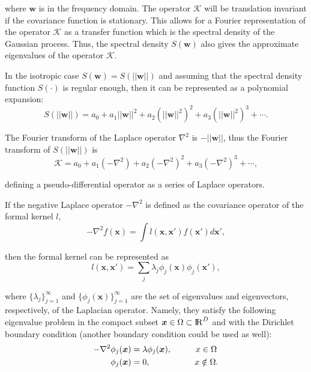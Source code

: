 \documentclass[onecolumn,a4paper,11pt]{article}
\begin{document}
\noindent where $\bm{w}$ is in the frequency domain. The operator $\mathcal{K}$ will be translation invariant if the covariance function is stationary. This allows for a Fourier representation of the operator $\mathcal{K}$ as a transfer function which is the spectral density of the Gaussian process. 
%
Thus, the spectral density $S(\bm{w})$ also gives the approximate eigenvalues of the operator $\mathcal{K}$.

In the isotropic case $S(\bm{w}) = S(||\bm{w}||)$ and assuming that the spectral density function $S(\cdot)$ is regular enough, then it can be represented as a polynomial expansion:
%
\begin{equation}\label{ch5_eq_S}
S(||\bm{w}||)=a_0+a_1||\bm{w}||^2+a_2(||\bm{w}||^2)^2+a_3(||\bm{w}||^2)^3+\cdots.
\end{equation}

\noindent The Fourier transform of the Laplace operator $\nabla^2$ is $-||\bm{w}||$, thus the Fourier transform of $S(||\bm{w}||)$ is
%
\begin{equation}\label{ch5_eq_K}
\mathcal{K}=a_0+a_1(-\nabla^2)+a_2(-\nabla^2)^2+a_3(-\nabla^2)^3+\cdots,
\end{equation}

\noindent defining a pseudo-differential operator as a series of Laplace operators.

If the negative Laplace operator $-\nabla^2$ is defined as the covariance operator of the formal kernel $l$,
%
\begin{equation*}
-\nabla^2 f(\bm{x}) = \int l(\bm{x},\bm{x}') f(\bm{x}') d\bm{x}',
\end{equation*} 

\noindent then the formal kernel can be represented as 
%
\begin{equation*}
l(\bm{x},\bm{x}')= \sum_j \lambda_j \phi_j(\bm{x}) \phi_j(\bm{x}'),
\end{equation*}

\noindent where $\{\lambda_j\}_{j=1}^{\infty}$ and $\{\phi_j(\bm{x})\}_{j=1}^{\infty}$ are the set of eigenvalues and eigenvectors, respectively, of the Laplacian operator. Namely, they satisfy the following eigenvalue problem in the compact subset $\bm{x} \in \Omega \subset {\rm I\!R}^D$ and with the Dirichlet boundary condition (another boundary condition could be used as well):
%
\begin{align*}
-\nabla^2 \phi_j(\bm{x})&=\lambda \phi_j(\bm{x}), \hspace{1cm}  x\in \Omega \nonumber \\ 
\phi_j(\bm{x})&=0, \hspace{1.85cm} x\notin \Omega.
\end{align*}  
\end{document}

